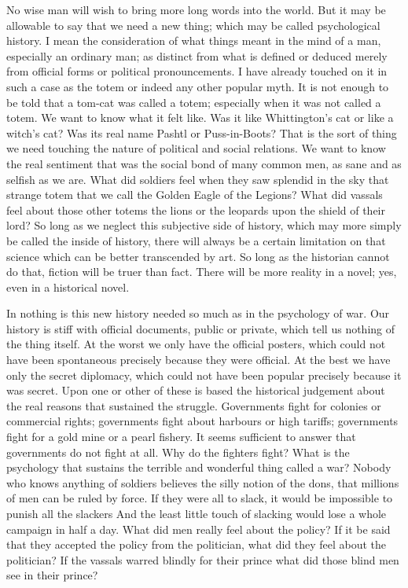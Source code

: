 No wise man will wish to bring more long words into the world. But it may be allowable to say that we need a new thing; which may be called psychological history. I mean the consideration of what things meant in the mind of a man, especially an ordinary man; as distinct from what is defined or deduced merely from official forms or political pronouncements. I have already touched on it in such a case as the totem or indeed any other popular myth. It is not enough to be told that a tom-cat was called a totem; especially when it was not called a totem. We want to know what it felt like. Was it like Whittington's cat or like a witch's cat? Was its real name Pashtl or Puss-in-Boots? That is the sort of thing we need touching the nature of political and social relations. We want to know the real sentiment that was the social bond of many common men, as sane and as selfish as we are. What did soldiers feel when they saw splendid in the sky that strange totem that we call the Golden Eagle of the Legions? What did vassals feel about those other totems the lions or the leopards upon the shield of their lord? So long as we neglect this subjective side of history, which may more simply be called the inside of history, there will always be a certain limitation on that science which can be better transcended by art. So long as the historian cannot do that, fiction will be truer than fact. There will be more reality in a novel; yes, even in a historical novel.

In nothing is this new history needed so much as in the psychology of war. Our history is stiff with official documents, public or private, which tell us nothing of the thing itself. At the worst we only have the official posters, which could not have been spontaneous precisely because they were official. At the best we have only the secret diplomacy, which could not have been popular precisely because it was secret. Upon one or other of these is based the historical judgement about the real reasons that sustained the struggle. Governments fight for colonies or commercial rights; governments fight about harbours or high tariffs; governments fight for a gold mine or a pearl fishery. It seems sufficient to answer that governments do not fight at all. Why do the fighters fight? What is the psychology that sustains the terrible and wonderful thing called a war? Nobody who knows anything of soldiers believes the silly notion of the dons, that millions of men can be ruled by force. If they were all to slack, it would be impossible to punish all the slackers And the least little touch of slacking would lose a whole campaign in half a day. What did men really feel about the policy? If it be said that they accepted the policy from the politician, what did they feel about the politician? If the vassals warred blindly for their prince what did those blind men see in their prince?

